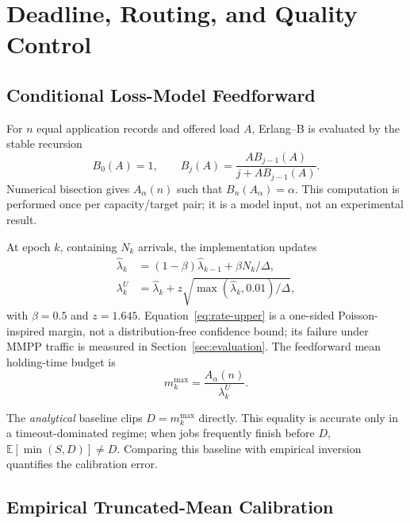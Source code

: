 \section{Deadline, Routing, and Quality Control}
\label{sec:controller}

\subsection{Conditional Loss-Model Feedforward}

For $n$ equal application records and offered load $A$, Erlang--B is evaluated by the stable recursion
\begin{equation}
 B_0(A)=1,\qquad B_j(A)=\frac{A B_{j-1}(A)}{j+A B_{j-1}(A)}.
 \label{eq:erlang-recursion}
\end{equation}
Numerical bisection gives $A_\alpha(n)$ such that $B_n(A_\alpha)=\alpha$. This computation is performed once per capacity/target pair; it is a model input, not an experimental result.

At epoch $k$, containing $N_k$ arrivals, the implementation updates
\begin{align}
 \widehat\lambda_k&=(1-\beta)\widehat\lambda_{k-1}+\beta N_k/\Delta,\\
 \lambda_k^{U}&=\widehat\lambda_k+z\sqrt{\max(\widehat\lambda_k,0.01)/\Delta},
 \label{eq:rate-upper}
\end{align}
with $\beta=0.5$ and $z=1.645$. Equation~\eqref{eq:rate-upper} is a one-sided Poisson-inspired margin, not a distribution-free confidence bound; its failure under MMPP traffic is measured in Section~\ref{sec:evaluation}. The feedforward mean holding-time budget is
\begin{equation}
 m_k^{\max}=\frac{A_\alpha(n)}{\lambda_k^{U}}.
 \label{eq:mean-budget}
\end{equation}

The \emph{analytical} baseline clips $D=m_k^{\max}$ directly. This equality is accurate only in a timeout-dominated regime; when jobs frequently finish before $D$, $\mathbb{E}[\min(S,D)]\neq D$. Comparing this baseline with empirical inversion quantifies the calibration error.

\subsection{Empirical Truncated-Mean Calibration}

